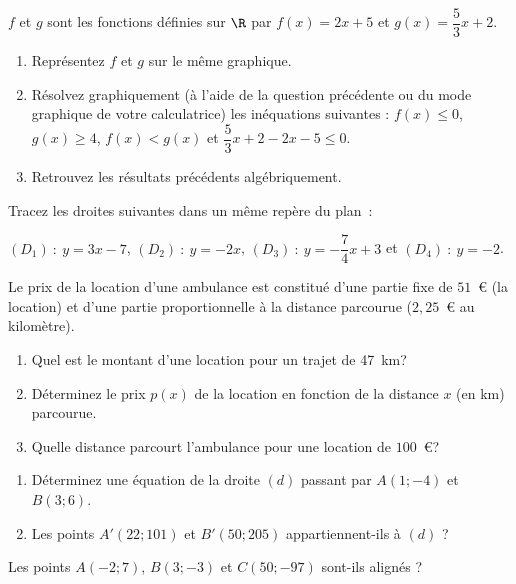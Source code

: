 %
%
%
\begin{exr} $f$ et $g$ sont les fonctions définies sur $\R$ par $f(x)=2x+5$ et $g(x)=\dfrac{5}{3}x+2$.
  \begin{enumerate}
  \item Représentez $f$ et $g$ sur le même graphique.
  \item Résolvez graphiquement (à l'aide de la question précédente ou du mode graphique de votre calculatrice) les inéquations suivantes : $f(x)\leqslant 0$, $g(x)\geqslant 4$, $f(x)<g(x)$ et $\dfrac{5}{3}x+2-2x-5\leqslant0$.
  \item Retrouvez les résultats précédents algébriquement.
  \end{enumerate}
\end{exr}
%
%
%
\begin{exr}Tracez les droites suivantes dans un même repère du plan~:

{\centering
$(D_1)~:~y=3x-7$, $(D_2)~:~y=-2x$, $(D_3)~:~y=-\dfrac{7}{4}x+3$ et $(D_4)~:~y=-2$.

}
\end{exr}
%
%
%
\begin{exr} Le prix de la location d'une ambulance est constitué d'une partie fixe de $51$~\euro{} (la location) et d'une partie proportionnelle à la distance parcourue ($2,25$~\euro{} au kilomètre).
  \begin{enumerate}
  \item Quel est le montant d'une location pour un trajet de \SI{47}{\kilo\metre}?
  \item Déterminez le prix $p(x)$ de la location en fonction de la distance $x$ (en \si{\kilo\meter}) parcourue.
  \item Quelle distance parcourt l'ambulance pour une location de $100$~\euro{}?
  \end{enumerate}
\end{exr}
%
%
%
\begin{exr}
      \begin{enumerate}
      \item Déterminez une équation de la droite $(d)$ passant par $A(1;-4)$ et $B(3;6)$.%
      \item Les points $A'(22;101)$ et $B'(50;205)$ appartiennent-ils à $(d)$ ?%
      \end{enumerate}
\end{exr}
%
%
%
\begin{exr}
Les points $A(-2;7)$, $B(3;-3)$ et $C(50;-97)$ sont-ils alignés ?
\end{exr}
